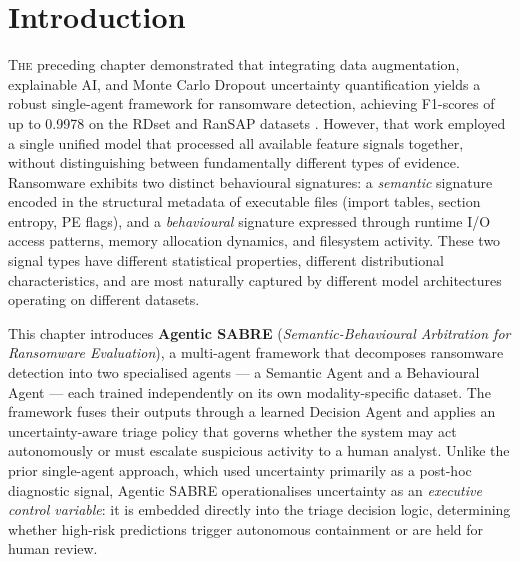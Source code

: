 

\section{Introduction}
\label{sec:eswa_intro}

\lettrine{T}{he} preceding chapter demonstrated that integrating data augmentation, explainable AI, and Monte Carlo Dropout uncertainty quantification yields a robust single-agent framework for ransomware detection, achieving F1-scores of up to 0.9978 on the RDset and RanSAP datasets \cite{kabuye2025explainable}. However, that work employed a single unified model that processed all available feature signals together, without distinguishing between fundamentally different types of evidence. Ransomware exhibits two distinct behavioural signatures: a \emph{semantic} signature encoded in the structural metadata of executable files (import tables, section entropy, PE flags), and a \emph{behavioural} signature expressed through runtime I/O access patterns, memory allocation dynamics, and filesystem activity. These two signal types have different statistical properties, different distributional characteristics, and are most naturally captured by different model architectures operating on different datasets.

This chapter introduces \textbf{Agentic SABRE} (\emph{Semantic-Behavioural Arbitration for Ransomware Evaluation}), a multi-agent framework that decomposes ransomware detection into two specialised agents — a Semantic Agent and a Behavioural Agent — each trained independently on its own modality-specific dataset. The framework fuses their outputs through a learned Decision Agent and applies an uncertainty-aware triage policy that governs whether the system may act autonomously or must escalate suspicious activity to a human analyst. Unlike the prior single-agent approach, which used uncertainty primarily as a post-hoc diagnostic signal, Agentic SABRE operationalises uncertainty as an \emph{executive control variable}: it is embedded directly into the triage decision logic, determining whether high-risk predictions trigger autonomous containment or are held for human review.

